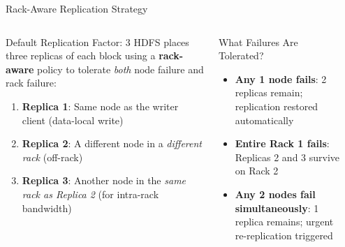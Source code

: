 \documentclass[aspectratio=169,10pt]{beamer}
\begin{document}
\begin{frame}{Rack-Aware Replication Strategy}
  \begin{columns}[T]
      \begin{block}{Default Replication Factor: 3}
        HDFS places three replicas of each block using a \textbf{rack-aware} policy to tolerate \emph{both} node failure and rack failure:
        \vspace{4pt}
        \begin{enumerate}
          \item \textbf{Replica 1}: Same node as the writer client (data-local write)
          \item \textbf{Replica 2}: A different node in a \emph{different rack} (off-rack)
          \item \textbf{Replica 3}: Another node in the \emph{same rack as Replica 2} (for intra-rack bandwidth)
        \end{enumerate}
      \end{block}
      \vspace{4pt}
      \begin{alertblock}{What Failures Are Tolerated?}
        \begin{itemize}
          \item \textbf{Any 1 node fails}: 2 replicas remain; replication restored automatically
          \item \textbf{Entire Rack 1 fails}: Replicas 2 and 3 survive on Rack 2
          \item \textbf{Any 2 nodes fail simultaneously}: 1 replica remains; urgent re-replication triggered
        \end{itemize}
      \end{alertblock}

      \begin{center}
\end{center}
\end{columns}
\end{frame}
\end{document}
